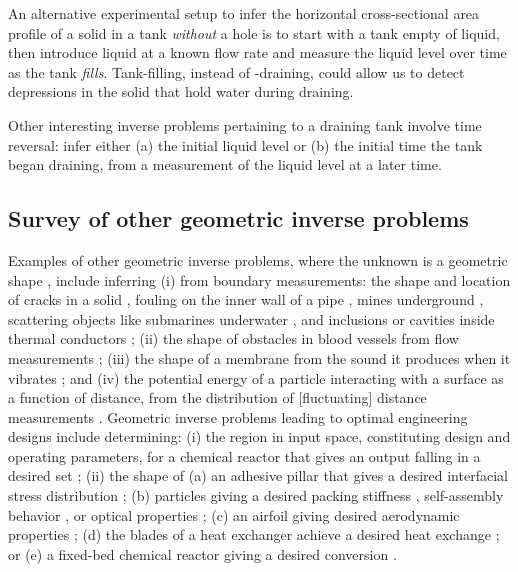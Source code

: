 \documentclass[a4paper,fleqn]{cas-dc}
\begin{document}
An alternative experimental setup to infer the horizontal cross-sectional area profile of a solid in a tank \emph{without} a hole is to start with a tank empty of liquid, then introduce liquid at a known flow rate and measure the liquid level over time as the tank \emph{fills}. Tank-filling, instead of -draining, could allow us to detect depressions in the solid that hold water during draining.

Other interesting inverse problems pertaining to a draining tank involve time reversal: infer either (a) the initial liquid level or (b) the initial time the tank began draining, from a measurement of the liquid level at a later time.

\subsection{Survey of other geometric inverse problems}
Examples of other geometric inverse problems, where the unknown is a geometric shape \cite{ameur2004level,burger2001level,harbrecht2013numerical,kawakami2020stabilities}, include inferring
(i) from boundary measurements: the shape and location of cracks in a solid \cite{nishimura1991boundary}, fouling on the inner wall of a pipe \cite{chen2011inverse}, mines underground \cite{delbary2007inverse,lopez2003detection}, scattering objects like submarines \cite{yaman2013survey} underwater \cite{buchanan2004marine}, and inclusions or cavities inside thermal conductors \cite{wang2018numerical,nakamura2015reconstruction};
(ii) the shape of obstacles in blood vessels from flow measurements \cite{aguayo2021distributed,nolte2022inverse}; 
(iii) the shape of a membrane from the sound it produces when it vibrates \cite{kac1966can}; 
and 
(iv) the potential energy of a particle interacting with a surface as a function of distance, from the distribution of [fluctuating] distance measurements \cite{prieve1999measurement}.
Geometric inverse problems leading to optimal engineering designs include determining: 
(i) the region in input space, constituting design and operating parameters, for a chemical reactor that gives an output falling in a desired set \cite{alves2023inverse,gazzaneo2019process}; 
(ii) the shape of (a) an adhesive pillar that gives a desired interfacial stress distribution \cite{kim2020designing};
(b) particles giving a desired packing stiffness \cite{miskin2013adapting}, self-assembly behavior \cite{sacanna2013engineering}, or optical properties \cite{forestiere2016inverse};
(c) an airfoil giving desired aerodynamic properties \cite{sun2015artificial};
(d) the blades of a heat exchanger achieve a desired heat exchange \cite{hilbert2006multi};
or
(e) a fixed-bed chemical reactor giving a desired conversion \cite{courtais2021shape}. 
\end{document}
